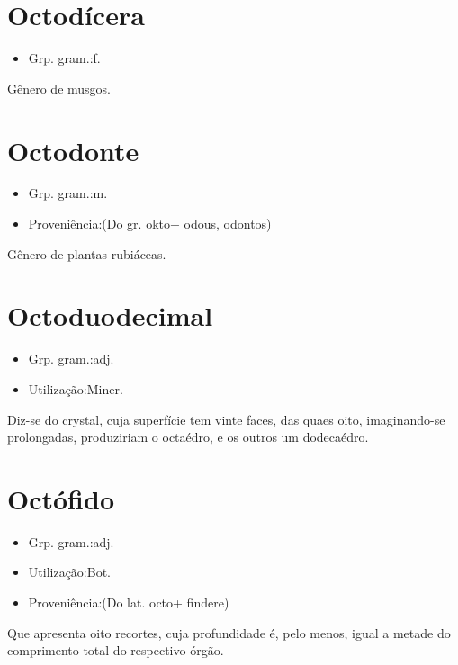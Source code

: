 \section{Octodícera}
\begin{itemize}
\item {Grp. gram.:f.}
\end{itemize}
Gênero de musgos.
\section{Octodonte}
\begin{itemize}
\item {Grp. gram.:m.}
\end{itemize}
\begin{itemize}
\item {Proveniência:(Do gr. \textunderscore okto\textunderscore  + \textunderscore odous\textunderscore , \textunderscore odontos\textunderscore )}
\end{itemize}
Gênero de plantas rubiáceas.
\section{Octoduodecimal}
\begin{itemize}
\item {Grp. gram.:adj.}
\end{itemize}
\begin{itemize}
\item {Utilização:Miner.}
\end{itemize}
Diz-se do crystal, cuja superfície tem vinte faces, das quaes oito, imaginando-se prolongadas, produziriam o octaédro, e os outros um dodecaédro.
\section{Octófido}
\begin{itemize}
\item {Grp. gram.:adj.}
\end{itemize}
\begin{itemize}
\item {Utilização:Bot.}
\end{itemize}
\begin{itemize}
\item {Proveniência:(Do lat. \textunderscore octo\textunderscore  + \textunderscore findere\textunderscore )}
\end{itemize}
Que apresenta oito recortes, cuja profundidade é, pelo menos, igual a metade do comprimento total do respectivo órgão.
